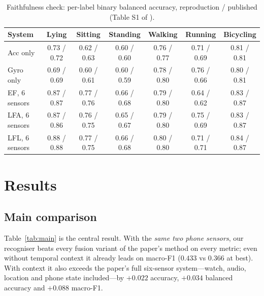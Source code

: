 \documentclass[11pt,a4paper]{article}
\begin{document}
\begin{table}[H]
\centering\small
\caption{Faithfulness check: per-label binary balanced accuracy, reproduction / published
(Table S1 of \cite{vaizman2017}).}
\label{tab:repro}
\begin{tabular}{@{}lcccccc@{}}
\toprule
System & Lying & Sitting & Standing & Walking & Running & Bicycling \\
\midrule
Acc only        & 0.73 / 0.72 & 0.62 / 0.63 & 0.60 / 0.60 & 0.76 / 0.77 & 0.71 / 0.69 & 0.81 / 0.81 \\
Gyro only       & 0.69 / 0.69 & 0.60 / 0.61 & 0.60 / 0.59 & 0.78 / 0.80 & 0.76 / 0.66 & 0.80 / 0.81 \\
EF, 6 sensors   & 0.87 / 0.87 & 0.77 / 0.76 & 0.66 / 0.68 & 0.79 / 0.80 & 0.64 / 0.62 & 0.83 / 0.87 \\
LFA, 6 sensors  & 0.87 / 0.86 & 0.76 / 0.75 & 0.65 / 0.67 & 0.79 / 0.80 & 0.75 / 0.69 & 0.83 / 0.87 \\
LFL, 6 sensors  & 0.88 / 0.88 & 0.77 / 0.75 & 0.66 / 0.68 & 0.80 / 0.80 & 0.71 / 0.71 & 0.84 / 0.87 \\
\bottomrule
\end{tabular}
\end{table}

\section{Results}
\label{sec:results}

\subsection{Main comparison}

Table~\ref{tab:main} is the central result. With the \emph{same two phone sensors}, our
recogniser beats every fusion variant of the paper's method on every metric; even
without temporal context it already leads on macro-F1 ($0.433$ vs $0.366$ at best). With
context it also exceeds the paper's full six-sensor system---watch, audio, location and
phone state included---by $+0.022$ accuracy, $+0.034$ balanced accuracy and $+0.088$
macro-F1.
\end{document}
